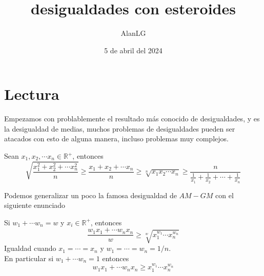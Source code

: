 \documentclass[11pt]{scrartcl}
\title{desigualdades con esteroides}
\author{AlanLG}
\date{5 de abril del 2024}
\begin{document}
\maketitle

\section{Lectura}

Empezamos con problablemente el resultado más conocido de desigualdades, y es la desigualdad de medias, muchos problemas de desigualdades pueden ser atacados con esto de alguna manera, incluso problemas muy complejos.

\begin{theorem}
    \label{Desigualdad de medias}
    Sean $x_1, x_2,\cdots x_n\in \mathbb{R^{+}}$, entonces
    \[\sqrt{\frac{x_1^2+x_2^2+\cdots x_n^2}{n}}\geq \frac{x_1+x_2+\cdots x_n}{n}\geq \sqrt[n]{x_1x_2\cdots x_n}\geq \frac{n}{\frac{1}{x_1}+\frac{1}{x_2}+\cdots+\frac{1}{x_n}}\]
\end{theorem}

Podemos generalizar un poco la famosa desigualdad de $AM-GM$ con el siguiente enunciado

\begin{theorem}
    [Weighted $AM-GM$]\label{Weighted AM-GM}

    Si $w_1+\cdots w_n=w$ y $x_i\in \mathbb{R^+}$, entonces 
    \[\frac{w_1x_1+\cdots w_nx_n}{w}\geq\sqrt[w]{x_1^{w_1}\cdots x_n^{w_n}}\]
Igualdad cuando $x_1=\cdots=x_n$ y $w_1=\cdots=w_n=1/n$.\\
En particular si $w_1+\cdots w_n=1$ entonces
    \[w_1x_1+\cdots w_nx_n\geq x_1^{w_1}\cdots x_n^{w_n}\]
\end{theorem}
\end{document}
